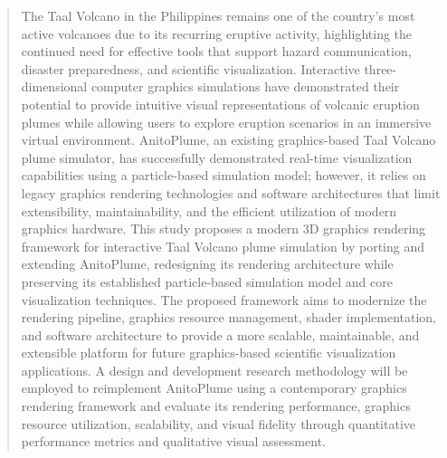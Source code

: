 %
%
%                 

\begin{abstract}
The Taal Volcano in the Philippines remains one of the country's most active volcanoes due to its recurring eruptive activity, highlighting the continued need for effective tools that support hazard communication, disaster preparedness, and scientific visualization. 
Interactive three-dimensional computer graphics simulations have demonstrated their potential to provide intuitive visual representations of volcanic eruption plumes while allowing users to explore eruption scenarios in an immersive virtual environment. 
AnitoPlume, an existing graphics-based Taal Volcano plume simulator, has successfully demonstrated real-time visualization capabilities using a particle-based simulation model; however, it relies on legacy graphics rendering technologies and software architectures that limit extensibility, maintainability, and the efficient utilization of modern graphics hardware. 
This study proposes a modern 3D graphics rendering framework for interactive Taal Volcano plume simulation by porting and extending AnitoPlume, redesigning its rendering architecture while preserving its established particle-based simulation model and core visualization techniques. 
The proposed framework aims to modernize the rendering pipeline, graphics resource management, shader implementation, and software architecture to provide a more scalable, maintainable, and extensible platform for future graphics-based scientific visualization applications. 
A design and development research methodology will be employed to reimplement AnitoPlume using a contemporary graphics rendering framework and evaluate its rendering performance, graphics resource utilization, scalability, and visual fidelity through quantitative performance metrics and qualitative visual assessment. 




\end{abstract}
